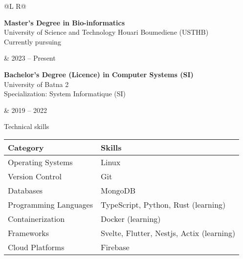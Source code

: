 \documentclass[a4paper,portrait,margin=0.5in]{article}
\begin{document}
\begin{tabularx}{\textwidth}{@{}L R@{}}
  \toprule
  \begin{minipage}[t]{\linewidth}
    \textbf{Master's Degree in Bio-informatics}\\
    University of Science and Technology Houari Boumediene (USTHB) \\
    Currently pursuing \\
  \end{minipage} & 2023 -- Present \\

  \midrule

  \begin{minipage}[t]{\linewidth}
    \textbf{Bachelor's Degree (Licence) in Computer Systems (SI)}\\
    University of Batna 2 \\
    Specialization: System Informatique (SI) \\
  \end{minipage} & 2019 -- 2022 \\
\end{tabularx}


\begin{minipage}[t]{\linewidth}
  Technical skills
\end{minipage}

\begin{tabularx}{\textwidth}{@{}l X@{}}
  \toprule
  \textbf{Category} & \textbf{Skills} \\
  \midrule
  Operating Systems & Linux \\
  Version Control & Git \\
  Databases & MongoDB \\
  Programming Languages & TypeScript, Python, Rust (learning) \\
  Containerization & Docker (learning) \\
  Frameworks & Svelte, Flutter, Nestjs, Actix (learning) \\
  Cloud Platforms & Firebase \\
\end{tabularx}
\end{document}
